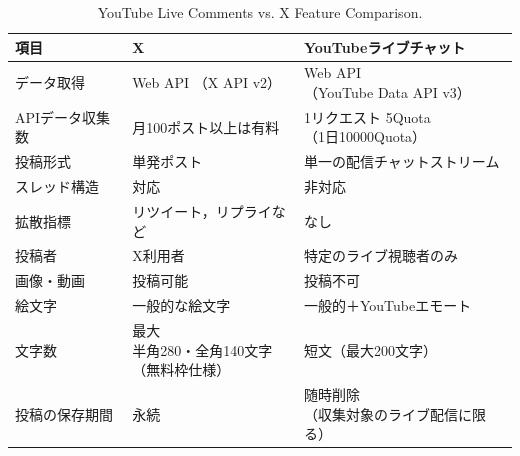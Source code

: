 \begin{table}[htbp]
    \centering
    \caption{YouTube Live Comments vs. X Feature Comparison.}
    \begin{tabular}{lll}
        \hline
        項目        & X                       & YouTubeライブチャット                            \\
        \hline
        \hline
        データ取得     & Web API （X API v2）      & \makecell[l]{Web API \\（YouTube Data API v3）}            \\
        APIデータ収集数 & 月100ポスト以上は有料            & \makecell[l]{1リクエスト 5Quota \\（1日10000Quota）} \\
        投稿形式      & 単発ポスト                   & 単一の配信チャットストリーム                         \\
        スレッド構造    & 対応                      & 非対応                                       \\
        拡散指標      & リツイート，リプライなど            & なし                         \\
        投稿者       & X利用者                    & 特定のライブ視聴者のみ                               \\
        画像・動画     & 投稿可能                    & 投稿不可                                      \\
        絵文字       & 一般的な絵文字                 & 一般的＋YouTubeエモート                           \\
        文字数       & \makecell[l]{最大 \\ 半角280・全角140文字\\（無料枠仕様）} & 短文（最大200文字）                               \\
        投稿の保存期間   & 永続                      & \makecell[l]{随時削除 \\（収集対象のライブ配信に限る）}                       \\
        \hline
    \end{tabular}
    \label{tab:yt_x_comp}
\end{table}